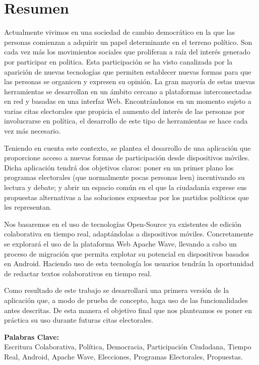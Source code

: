\chapter*{Resumen}
Actualmente vivimos en una sociedad de cambio democrático en la que las personas comienzan a adquirir un papel determinante en el terreno político. Son cada vez más los movimientos sociales que proliferan a raíz del interés generado por participar en politica. Esta participación se ha visto canalizada por la aparición de nuevas tecnologías que permiten establecer nuevas formas para que las personas se organicen y expresen su opinión. La gran mayoría de estas nuevas herramientas se desarrollan en un ámbito cercano a plataformas interconectadas en red y basadas en una interfaz Web. Encontrándonos en un momento sujeto a varias citas electorales que propicia el aumento del interés de las personas por involucrarse en política, el desarrollo de este tipo de herramientas se hace cada vez más necesario.

Teniendo en cuenta este contexto, se plantea el desarrollo de una aplicación que proporcione acceso a nuevas formas de participación desde dispositivos móviles. Dicha aplicación tendrá dos objetivos claros: poner en un primer plano los programas electorales (que normalmente pocas personas leen) incentivando su lectura y debate; y abrir un espacio común en el que la ciudadanía exprese sus propuestas alternativas a las soluciones expuestas por los partidos políticos que les representan.

Nos basaremos en el uso de tecnologías Open-Source ya existentes de edición colaborativa en tiempo real, adaptándolas a dispositivos móviles. Concretamente se explorará el uso de la plataforma Web Apache Wave, llevando a cabo un proceso de migración que permita explotar su potencial en dispositivos basados en Android. Haciendo uso de esta tecnología los usuarios tendrán la oportunidad de redactar textos colaborativos en tiempo real.

Como resultado de este trabajo se desarrollará una primera versión de la aplicación que, a modo de prueba de concepto, haga uso de las funcionalidades antes descritas. De esta manera el objetivo final que nos planteamos es poner en práctica su uso durante futuras citas electorales.

\vfill
{\bf Palabras Clave:}\\
{Escritura Colaborativa, Política, Democracia, Participación Ciudadana, Tiempo Real, Android, Apache Wave, Elecciones, Programas Electorales, Propuestas.}

\newpage
\thispagestyle{empty}
\mbox{}


